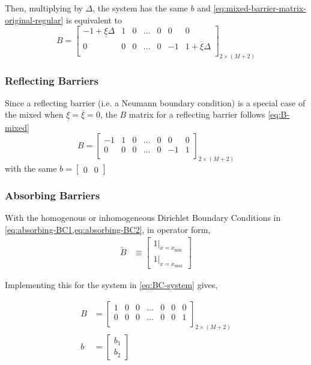 \documentclass[11pt]{article}
\theoremstyle{definition}
\begin{document}
Then, multiplying by $\Delta$, the system has the same $b$ and \cref{eq:mixed-barrier-matrix-original-regular} is equivalent to
\begin{equation}
B = \begin{bmatrix}
-1 +  \underline{\xi} \Delta & 1 & 0 & \dots & 0 & 0 & 0 \\
0 & 0 & 0 & \dots & 0 & -1 & 1 + \overline{\xi} \Delta\\
\end{bmatrix}_{2 \times (M+2)}\label{eq:B-mixed}
\end{equation}

\subsubsection{Reflecting Barriers}
Since a reflecting barrier (i.e. a Neumann boundary condition) is a special case of the mixed when  $\underline{\xi} = \bar{\xi} = 0$, the $B$ matrix for a reflecting barrier follows \cref{eq:B-mixed}
\begin{equation}
	B = \begin{bmatrix}
	-1& 1 & 0 & \dots & 0 & 0 & 0 \\
	0 & 0 & 0 & \dots & 0 & -1 & 1\\
	\end{bmatrix}_{2 \times (M+2)}
	\end{equation}
with the same $b = \begin{bmatrix}	0&	0\end{bmatrix}$

	\subsubsection{Absorbing Barriers}

With the homogenous or inhomogeneous Dirichlet Boundary Conditions in \cref{eq:absorbing-BC1,eq:absorbing-BC2}, in operator form,
\begin{align}
	\tilde{B} &\equiv \begin{bmatrix}
	1 \vert_{x = x_{\min}}\\
	1 \vert_{x = x_{\max}}
	\end{bmatrix}
\end{align}

Implementing this for the system in \cref{eq:BC-system} gives,

\begin{align}
B &= \begin{bmatrix}
1 & 0 & 0 & \dots & 0 & 0 & 0 \\
0 & 0 & 0 & \dots & 0 & 0 & 1\\
\end{bmatrix}_{2 \times (M+2)}\label{eq:absorbing-barrier-matrix-regular}\\
b &= \begin{bmatrix}
b_1 \\
b_2
\end{bmatrix}
\end{align}
\end{document}
